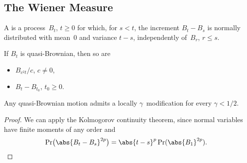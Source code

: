 \subsection	{The Wiener Measure}

\begin	{definition}
A  is a process~$B_t$, \( t \ge 0 \)
for which, for \( s < t \), the increment \( B_t - B_s \)
is normally distributed with mean~$0$ and variance \( t - s \),
independently of~$B_r$, \( r \le s \).
\end	{definition}

\begin	{lemma}
If $B_t$ is quasi-Brownian, then so are
\begin	{itemize}
\item	$B_{c^2 t}/c$, \( c \ne 0 \),
\item	\( B_t - B_{t_0} \), \( t_0 \ge 0 \).
\end	{itemize}
\end	{lemma}

\begin	{theorem}
Any quasi-Brownian motion admits a locally $\gamma$\dashHolder\ modification
for every \( \gamma < 1/2 \).
\end	{theorem}
\begin	{proof}
We can apply the Kolmogorov continuity theorem, %
since normal variables have finite moments of any order and \[
	\Pr\bigl( \abs{B_t - B_s}^{2p} \bigr)
	=	\abs{t-s}^p \Pr(\abs{B_1}^{2p})
	\text.
	\qedhere
\]
\end	{proof}
